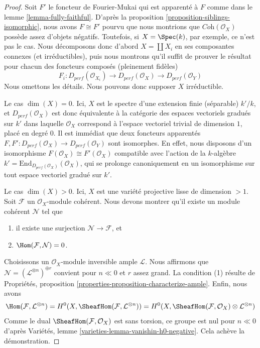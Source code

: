 \begin{proof}
Soit $F'$ le foncteur de Fourier-Mukai qui est apparenté à $F$
comme dans le lemme \ref{lemma-fully-faithful}.
D'après la proposition \ref{proposition-siblings-isomorphic}, nous avons $F \cong F'$
pourvu que nous montrions que $\textit{Coh}(\mathcal{O}_X)$ possède assez
d'objets négatifs. Toutefois, si $X = \Spec(k)$, par exemple,
ce n'est pas le cas. Nous décomposons donc d'abord $X = \coprod X_i$
en ses composantes connexes (et irréductibles), puis nous
montrons qu'il suffit de prouver le résultat pour chacun des
foncteurs composés (pleinement fidèles)
$$
F_i :
D_{perf}(\mathcal{O}_{X_i}) \to
D_{perf}(\mathcal{O}_X) \to
D_{perf}(\mathcal{O}_Y)
$$
Nous omettons les détails. Nous pouvons donc supposer $X$ irréductible.

\medskip\noindent
Le cas $\dim(X) = 0$. Ici, $X$ est le spectre d'une extension finie (séparable)
$k'/k$, et $D_{perf}(\mathcal{O}_X)$ est donc équivalente à la catégorie
des espaces vectoriels gradués sur $k'$ dans laquelle
$\mathcal{O}_X$ correspond à
l'espace vectoriel trivial de dimension $1$, placé en degré $0$.
Il est immédiat que deux foncteurs apparentés
$F, F' : D_{perf}(\mathcal{O}_X) \to D_{perf}(\mathcal{O}_Y)$
sont isomorphes. En effet, nous disposons d'un isomorphisme
$F(\mathcal{O}_X) \cong F'(\mathcal{O}_X)$
compatible avec l'action de la $k$-algèbre
$k' = \text{End}_{D_{perf}(\mathcal{O}_X)}(\mathcal{O}_X)$,
qui se prolonge canoniquement en un isomorphisme sur tout espace vectoriel gradué sur $k'$.

\medskip\noindent
Le cas $\dim(X) > 0$. Ici, $X$ est une variété projective lisse
de dimension $> 1$. Soit $\mathcal{F}$ un
$\mathcal{O}_X$-module cohérent.
Nous devons montrer qu'il existe un module cohérent $\mathcal{N}$ tel que
\begin{enumerate}
\item il existe une surjection $\mathcal{N} \to \mathcal{F}$, et
\item $\Hom(\mathcal{F}, \mathcal{N}) = 0$.
\end{enumerate}
Choisissons un $\mathcal{O}_X$-module inversible ample $\mathcal{L}$.
Nous affirmons que $\mathcal{N} = (\mathcal{L}^{\otimes n})^{\oplus r}$
convient pour $n \ll 0$ et $r$ assez grand.
La condition (1) résulte de
Propriétés, proposition \ref{properties-proposition-characterize-ample}.
Enfin, nous avons
$$
\Hom(\mathcal{F}, \mathcal{L}^{\otimes n}) =
H^0(X, \SheafHom(\mathcal{F}, \mathcal{L}^{\otimes n})) =
H^0(X, \SheafHom(\mathcal{F}, \mathcal{O}_X) \otimes \mathcal{L}^{\otimes n})
$$
Comme le dual $\SheafHom(\mathcal{F}, \mathcal{O}_X)$ est sans torsion, ce groupe
est nul pour $n \ll 0$ d'après Variétés, lemme
\ref{varieties-lemma-vanishin-h0-negative}. Cela achève la démonstration.
\end{proof}

